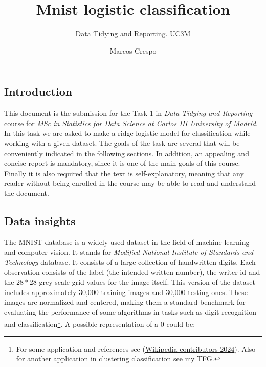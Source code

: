 \documentclass[
  10pt,
]{article}
\title{Mnist logistic classification}
\subtitle{Data Tidying and Reporting. UC3M}
\author{Marcos Crespo}
\date{}
\begin{document}
\maketitle

\hypertarget{introduction}{%
\subsection{Introduction}\label{introduction}}

This document is the submission for the Task 1 in \emph{Data Tidying and
Reporting} course for \emph{MSc in Statistics for Data Science at Carlos
III University of Madrid}. In this task we are asked to make a ridge
logistic model for classification while working with a given dataset.
The goals of the task are several that will be conveniently indicated in
the following sections. In addition, an appealing and concise report is
mandatory, since it is one of the main goals of this course. Finally it
is also required that the text is self-explanatory, meaning that any
reader without being enrolled in the course may be able to read and
understand the document.

\hypertarget{data-insights}{%
\subsection{Data insights}\label{data-insights}}

The MNIST database is a widely used dataset in the field of machine
learning and computer vision. It stands for \emph{Modified National
Institute of Standards and Technology} database. It consists of a large
collection of handwritten digits. Each observation consists of the label
(the intended written number), the writer id and the \(28*28\) grey
scale grid values for the image itself. This version of the dataset
includes approximately 30,000 training images and 30,000 testing ones.
These images are normalized and centered, making them a standard
benchmark for evaluating the performance of some algorithms in tasks
such as digit recognition and classification\footnote{For some
  application and references see
  (\protect\hyperlink{ref-enwiki:1199732782}{Wikipedia contributors
  2024}). Also for another application in clustering classification see
  \href{https://drive.google.com/file/d/10lz-Mb0Otr4FnVMBtQrqzTmlPGbF0smE/view?usp=sharing}{my
  TFG}.}. A possible representation of a \(0\) could be:
\end{document}
